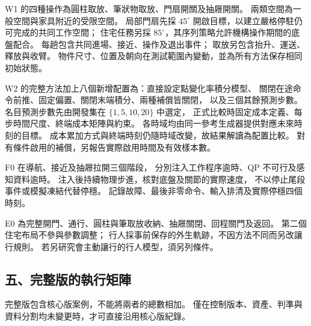 W1 的四種操作為圓柱取放、筆狀物取放、門扇開關及抽屜開關。
兩類空間為一般空間與家具附近的受限空間。
局部門扇先採 $45^\circ$ 開啟目標，以建立嚴格停駐仍可完成的共同工作空間；
住宅任務另採 $85^\circ$，其序列策略允許機構操作期間的底盤配合。
每趟包含共同進場、接近、操作及退出事件；
取放另包含抬升、運送、釋放與收臂。
物件尺寸、位置及朝向在測試範圍內變動，並為所有方法保存相同初始狀態。

W2 的完整方法加上八個新增配置為：直接設定點變化率積分模型、
關閉在途命令前推、固定偏置、關閉末端積分、兩種補償皆關閉，
以及三個其餘預測步數。
名目預測步數先由開發集在 $\{1,5,10,20\}$ 中選定，
正式比較時固定成本定義、每步時間尺度、終端成本矩陣與約束。
各時域均由同一參考生成器提供對應未來時刻的目標。
成本累加方式與終端時刻仍隨時域改變，故結果解讀為配置比較。
對有條件啟用的補償，另報告實際啟用時間及有效樣本數。

F0 在導航、接近及抽屜拉開三個階段，
分別注入工作程序逾時、QP 不可行及感知資料逾時。
注入後持續物理步進，核對底盤及關節的實際速度，
不以停止尾段事件或模擬凍結代替停穩。
記錄故障、最後非零命令、輸入排清及實際停穩四個時刻。

E0 為完整開門、通行、圓柱與筆取放收納、抽屜關閉、回程關門及返回。
第二個住宅布局不參與參數調整；
行人採事前保存的外生軌跡，不因方法不同而另改讓行規則。
若另研究會主動讓行的行人模型，須另列條件。

\subsection*{五、完整版的執行矩陣}

完整版包含核心版案例，不能將兩者的總數相加。
僅在控制版本、資產、判準與資料分割均未變更時，才可直接沿用核心版紀錄。

